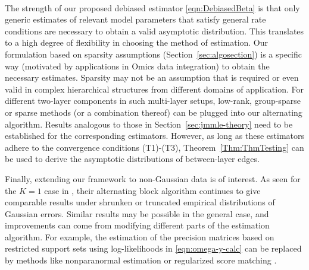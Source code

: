 \paragraph*{}
The strength of our proposed debiased estimator \eqref{eqn:DebiasedBeta} is that only generic estimates of relevant model parameters that satisfy general rate conditions are necessary to obtain a valid asymptotic distribution. This translates to a high degree of flexibility in choosing the method of estimation. Our formulation based on sparsity assumptions (Section~\ref{sec:algosection}) is a specific way (motivated by applications in Omics data integration) to obtain the necessary estimates. Sparsity may not be an assumption that is required or even valid in complex hierarchical structures from different domains of application. For different two-layer components in such multi-layer setups, low-rank, group-sparse or sparse methods (or a combination thereof) can be plugged into our alternating algorithm. Results analogous to those in Section~\ref{sec:jmmle-theory} need to be established for the corresponding estimators. However, as long as these estimators adhere to the convergence conditions (T1)-(T3), Theorem~\ref{Thm:ThmTesting} can be used to derive the asymptotic distributions of between-layer edges.

Finally, extending our framework to non-Gaussian data is of interest. As seen for the $K=1$ case in \citet{LinEtal16}, their alternating block algorithm continues to give comparable results under shrunken or truncated empirical distributions of Gaussian errors. Similar results may be possible in the general case, and improvements can come from modifying different parts of the estimation algorithm. For example, the estimation of the precision matrices based on restricted support sets using log-likelihoods in \eqref{eqn:omega-y-calc} can be replaced by methods like nonparanormal estimation \citep{LiuLaffertyWasserman09} or regularized score matching \citep{LinDrtonShojaie16}.